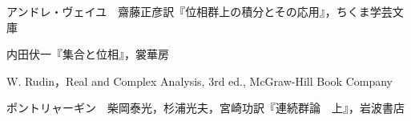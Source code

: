 \begin{thebibliography}{9}
\item アンドレ・ヴェイユ　齋藤正彦訳『位相群上の積分とその応用』，ちくま学芸文庫
\item 内田伏一『集合と位相』，裳華房
\item W. Rudin，Real and Complex Analysis, 3rd ed., McGraw-Hill Book Company
\item ポントリャーギン　柴岡泰光，杉浦光夫，宮崎功訳『連続群論　上』，岩波書店
\end{thebibliography}
